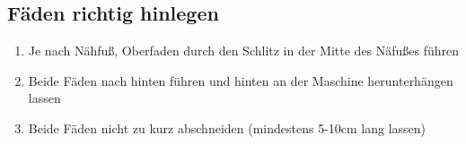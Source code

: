 \documentclass{\basedir/fablab-document}
\begin{document}
\subsection{Fäden richtig hinlegen}
\begin{enumerate}
	\item Je nach Nähfuß, Oberfaden durch den Schlitz in der Mitte des Näfußes führen
	\item Beide Fäden nach hinten führen und hinten an der Maschine herunterhängen lassen
	\item Beide Fäden nicht zu kurz abschneiden (mindestens 5-10cm lang lassen)
\end{enumerate}


\newpage
{}
\end{document}
